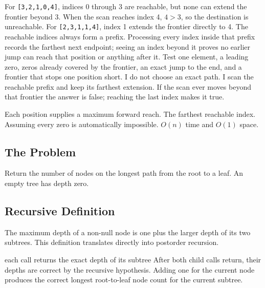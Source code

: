 \lessonexpansion
  {For \texttt{[3,2,1,0,4]}, indices 0 through 3 are reachable, but none can
   extend the frontier beyond 3. When the scan reaches index 4, \(4>3\), so
   the destination is unreachable. For \texttt{[2,3,1,1,4]}, index 1 extends
   the frontier directly to 4.}
  {The reachable indices always form a prefix. Processing every index inside
   that prefix records the farthest next endpoint; seeing an index
   beyond it proves no earlier jump can reach that position or anything after
   it.}
  {Test one element, a leading zero, zeros already covered by the frontier,
   an exact jump to the end, and a frontier that stops one position short.}
  {I do not choose an exact path. I scan the reachable prefix and keep its
   farthest extension. If the scan ever moves beyond that frontier the answer
   is false; reaching the last index makes it true.}

\chaptercheckpoint
  {Each position supplies a maximum forward reach.}
  {The farthest reachable index.}
  {Assuming every zero is automatically impossible.}
  {$O(n)$ time and $O(1)$ space.}



\subsection{The Problem}
Return the number of nodes on the longest path from the root to a leaf. An
empty tree has depth zero.

\subsection{Recursive Definition}
The maximum depth of a non-null node is one plus the larger depth of its two
subtrees. This definition translates directly into postorder recursion.

\begin{invariantbox}{each call returns the exact depth of its subtree}
After both child calls return, their depths are correct by the recursive
hypothesis. Adding one for the current node produces the correct
longest root-to-leaf node count for the current subtree.
\end{invariantbox}

